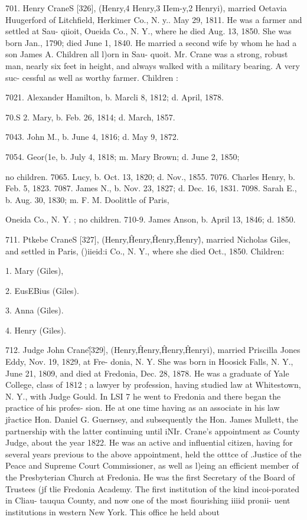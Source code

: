 \documentclass{book}
\begin{document}
701. Henry CraneS [326], (Henry,4 Henry,3 IIem-y,2 
Henryi), married Oetavia Huugerford of Litchfield, Herkimer 
Co., N. y.. May 29, 1811. He was a farmer and settled at Sau- 
qiioit, Oueida Co., N. Y., where he died Aug. 13, 1850. She 
was born Jan., 1790; died June 1, 1840. He married a second 
wife by whom he had a son James A. Children all l)orn in Sau- 
quoit. Mr. Crane was a strong, robust man, nearly six feet in 
height, and always walked with a military bearing. A very suc- 
cessful as well as worthy farmer. Children : 

7021. Alexander Hamilton, b. Marcli 8, 1812; d. April, 1878. 

70.S 2. Mary, b. Feb. 26, 1814; d. March, 1857. 

7043. John M., b. June 4, 1816; d. May 9, 1872. 

7054. Geor(1e, b. July 4, 1818; m. Mary Brown; d. June 2, 1850; 

no children. 
7065. Lucy, b. Oct. 13, 1820; d. Nov., 1855. 
7076. Charles Henry, b. Feb. 5, 1823. 
7087. James N., b. Nov. 23, 1827; d. Dec. 16, 1831. 
7098. Sarah E., b. Aug. 30, 1830; m. F. M. Doolittle of Paris, 

Oneida Co., N. Y. ; no children. 
710-9. James Anson, b. April 13, 1846; d. 1850. 

711. Ptkebe CraneS [327], (Henry,\^ Henry,\^ Henry,\^ 
Henry\^), married Nicholas Giles, and settled in Paris, ()iieid:i 
Co., N. Y., where she died Oct., 1850. Children: 

1. Mary (Giles), 

2. EusEBius (Giles). 

3. Anna (Giles). 

4. Henry (Giles). 

712. Judge John Crane\^ [329], (Henry,\^ Henry,\^ Henry,\^ 
Henryi), married Priscilla Jones Eddy, Nov. 19, 1829, at Fre- 
donia, N. Y. She was born in Hoosick Falls, N. Y., June 21, 
1809, and died at Fredonia, Dec. 28, 1878. He was a graduate 
of Yale College, class of 1812 ; a lawyer by profession, having 
studied law at Whitestown, N. Y., with Judge Gould. In LSI 7 
he went to Fredonia and there began the practice of his profes- 
sion. He at one time having as an associate in his law j\^ractice 
Hon. Daniel G. Guernsey, and subsequently the Hon. James 
Mullett, the partnership with the latter continuing until iNIr. 
Crane's appointment as County Judge, about the year 1822. He 
was an active and influential citizen, having for several years 
previous to the above appointment, held the otttce of .Justice of 
the Peace and Supreme Court Commissioner, as well as l)eing an 
efficient member of the Presbyterian Church at Fredonia. He 
was the first Secretary of the Board of Trustees (jf tlie Fredonia 
Academy. The first institution of the kind incoi-porated in Cliau- 
tauqua County, and now one of the most fiourishing iiiid pronii- 
uent institutions in western New York. This office he held about 
\end{document}

